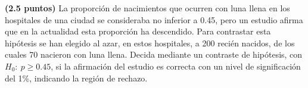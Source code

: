 
\textbf{(2.5 puntos)} La proporción de nacimientos que ocurren con luna llena en los hospitales de una ciudad se consideraba no inferior a 0.45, pero un estudio afirma que en la actualidad esta proporción ha descendido. Para contrastar esta hipótesis se han elegido al azar, en estos hospitales, a 200 recién nacidos, de los cuales 70 nacieron con luna llena. Decida mediante un contraste de hipótesis, con $H_0:\ p\geq 0.45$, si la afirmación del estudio es correcta con un nivel de significación del 1\%, indicando la región de rechazo.
